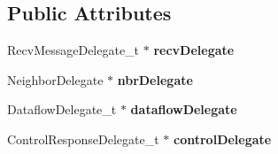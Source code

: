\subsection*{Public Attributes}
\begin{DoxyCompactItemize}
\item 
Recv\+Message\+Delegate\+\_\+t $\ast$ {\bfseries recv\+Delegate}\hypertarget{class_patterns_1_1_pattern_base_a51cc459a516bcf914b9ec91e198bc057}{}\label{class_patterns_1_1_pattern_base_a51cc459a516bcf914b9ec91e198bc057}

\item 
Neighbor\+Delegate $\ast$ {\bfseries nbr\+Delegate}\hypertarget{class_patterns_1_1_pattern_base_a62e4f5844c3b0573b5ef28696d5f4b36}{}\label{class_patterns_1_1_pattern_base_a62e4f5844c3b0573b5ef28696d5f4b36}

\item 
Dataflow\+Delegate\+\_\+t $\ast$ {\bfseries dataflow\+Delegate}\hypertarget{class_patterns_1_1_pattern_base_adbecd83eb5b30fb4df328d2b74949d30}{}\label{class_patterns_1_1_pattern_base_adbecd83eb5b30fb4df328d2b74949d30}

\item 
Control\+Response\+Delegate\+\_\+t $\ast$ {\bfseries control\+Delegate}\hypertarget{class_patterns_1_1_pattern_base_af563c486553ba15d62ea3fbb1bf7948b}{}\label{class_patterns_1_1_pattern_base_af563c486553ba15d62ea3fbb1bf7948b}

\end{DoxyCompactItemize}
